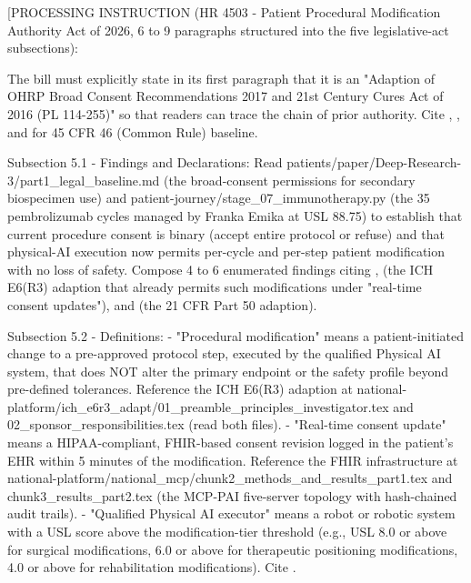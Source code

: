 
[PROCESSING INSTRUCTION (HR 4503 - Patient Procedural Modification
Authority Act of 2026, 6 to 9 paragraphs structured into the five
legislative-act subsections):

The bill must explicitly state in its first paragraph that it is an
"Adaption of OHRP Broad Consent Recommendations 2017 and 21st Century
Cures Act of 2016 (PL 114-255)" so that readers can trace the chain of
prior authority. Cite \cite{ohrp_broad_consent_attachment_c_2017},
\cite{rank1_cures_act_2016}, and
\cite{hhs_45cfr46_protection_human_subjects} for 45 CFR 46 (Common
Rule) baseline.

Subsection 5.1 - Findings and Declarations: Read
patients/paper/Deep-Research-3/part1\_legal\_baseline.md (the
broad-consent permissions for secondary biospecimen use) and
patient-journey/stage\_07\_immunotherapy.py (the 35 pembrolizumab cycles
managed by Franka Emika at USL 88.75) to establish that current
procedure consent is binary (accept entire protocol or refuse) and
that physical-AI execution now permits per-cycle and per-step
patient modification with no loss of safety. Compose 4 to 6 enumerated
findings citing \cite{kawchak_2026_19119939},
\cite{kawchak_2026_18973368} (the ICH E6(R3) adaption that already
permits such modifications under "real-time consent updates"), and
\cite{kawchak_2026_19040707} (the 21 CFR Part 50 adaption).

Subsection 5.2 - Definitions:
- "Procedural modification" means a patient-initiated change to a
  pre-approved protocol step, executed by the qualified Physical AI
  system, that does NOT alter the primary endpoint or the safety
  profile beyond pre-defined tolerances. Reference the
  ICH E6(R3) adaption at
  national-platform/ich\_e6r3\_adapt/01\_preamble\_principles\_investigator.tex
  and 02\_sponsor\_responsibilities.tex (read both files).
- "Real-time consent update" means a HIPAA-compliant, FHIR-based
  consent revision logged in the patient's EHR within 5 minutes of
  the modification. Reference the FHIR infrastructure at
  national-platform/national\_mcp/chunk2\_methods\_and\_results\_part1.tex
  and chunk3\_results\_part2.tex (the MCP-PAI five-server topology with
  hash-chained audit trails).
- "Qualified Physical AI executor" means a robot or robotic system
  with a USL score above the modification-tier threshold (e.g.,
  USL 8.0 or above for surgical modifications, 6.0 or above for
  therapeutic positioning modifications, 4.0 or above for
  rehabilitation modifications). Cite \cite{kawchak_2026_18778219}.

